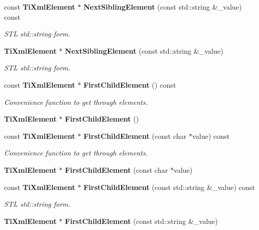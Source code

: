 \begin{CompactItemize}
\item 
const {\bf Ti\-Xml\-Element} $\ast$ {\bf Next\-Sibling\-Element} (const std::string \&\_\-value) const\label{classTiXmlNode_TiXmlUnknowna54}

\begin{CompactList}\small\item\em STL std::string form. \item\end{CompactList}\item 
{\bf Ti\-Xml\-Element} $\ast$ {\bf Next\-Sibling\-Element} (const std::string \&\_\-value)\label{classTiXmlNode_TiXmlUnknowna55}

\begin{CompactList}\small\item\em STL std::string form. \item\end{CompactList}\item 
const {\bf Ti\-Xml\-Element} $\ast$ {\bf First\-Child\-Element} () const\label{classTiXmlNode_TiXmlUnknowna56}

\begin{CompactList}\small\item\em Convenience function to get through elements. \item\end{CompactList}\item 
{\bf Ti\-Xml\-Element} $\ast$ {\bf First\-Child\-Element} ()\label{classTiXmlNode_TiXmlUnknowna57}

\item 
const {\bf Ti\-Xml\-Element} $\ast$ {\bf First\-Child\-Element} (const char $\ast$value) const\label{classTiXmlNode_TiXmlUnknowna58}

\begin{CompactList}\small\item\em Convenience function to get through elements. \item\end{CompactList}\item 
{\bf Ti\-Xml\-Element} $\ast$ {\bf First\-Child\-Element} (const char $\ast$value)\label{classTiXmlNode_TiXmlUnknowna59}

\item 
const {\bf Ti\-Xml\-Element} $\ast$ {\bf First\-Child\-Element} (const std::string \&\_\-value) const\label{classTiXmlNode_TiXmlUnknowna60}

\begin{CompactList}\small\item\em STL std::string form. \item\end{CompactList}\item 
{\bf Ti\-Xml\-Element} $\ast$ {\bf First\-Child\-Element} (const std::string \&\_\-value)\label{classTiXmlNode_TiXmlUnknowna61}


\end{CompactItemize}
